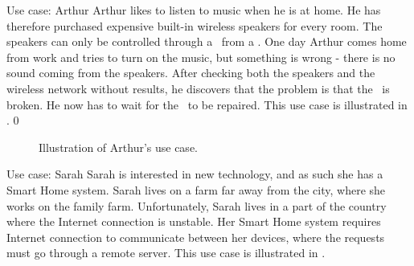 \begin{colbox}{Use case: Arthur}
Arthur likes to listen to music when he is at home. He has therefore purchased expensive built-in wireless speakers for every room. The speakers can only be controlled through a \hub~from a \phone. One day Arthur comes home from work and tries to turn on the music, but something is wrong - there is no sound coming from the speakers. After checking both the speakers and the wireless network without results, he discovers that the problem is that the \hub~is broken. He now has to wait for the \hub~to be repaired. This use case is illustrated in .
0\end{colbox}

\begin{figure}[H]
     \caption{\label{fig:use-case-2} Illustration of Arthur's use case.}
\end{figure}


\begin{colbox}{Use case: Sarah}
Sarah is interested in new technology, and as such she has a Smart Home system. Sarah lives on a farm far away from the city, where she works on the family farm. Unfortunately, Sarah lives in a part of the country where the Internet connection is unstable. Her Smart Home system requires Internet connection to communicate between her devices, where the requests must go through a remote server. This use case is illustrated in .
\end{colbox}

